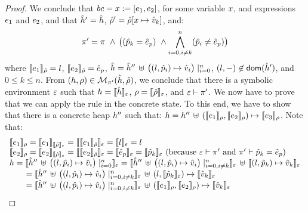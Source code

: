 \begin{proof}
\noindent{}
We conclude that $\bcmd = \jvar := [\jsilexpr_1, \jsilexpr_2]$, for some variable $\jvar$, and expressions $\jsilexpr_1$ and $\jsilexpr_2$, 
and that $\sheap' = \sheap$, $\sstore' = \sstore[\jvar \mapsto \sexprv_k]$, and: 
 $$\pc' =  \pc \ \wedge \, \big( (\sexprp_k = \sexpr_p) \ \wedge \bigwedge_{i = 0, i \neq k}^n (\sexprp_i \neq \sexpr_p) \big)$$
 where 
 $\symbeval{\jsilexpr_1}{\sstore} =  \loc$, $\symbeval{\jsilexpr_2}{\sstore} =  \sexpr_p$, 
 $\sheap = \sheap'' \, \uplus \, \big((l, \sexprp_i) \mapsto \sexprv_i\big)\mid_{i = 0}^n$, 
 $(l, -) \not\in \domain(\sheap')$, and $0 \leq k \leq n$. 
%
From $(\heap, \store) \in \smodels{\sheap, \sstore}{\pc'}$, we conclude that there is a symbolic environment
$\senv$ such that $\heap = \semexpr{\sheap}{\senv}$, $\store = \semexpr{\sstore}{\senv}$, and 
$\senv \vdash \pc'$. 
We now have to prove that we can apply the  rule in the concrete state.
To this end, we have to show that there is a concrete heap $\heap''$ such that:
$\heap = \heap'' \dunion \hcell{\symbeval{\jsilexpr_1}{\store}}{\symbeval{\jsilexpr_2}{\store}}{\symbeval{\jsilexpr_3}{\store}}$. 
Note that: 
$$
\begin{array}{l}
%
 \symbeval{\jsilexpr_1}{\store} = \symbeval{\jsilexpr_1}{\symbeval{\sstore}{\senv}} = \symbeval{\symbeval{\jsilexpr_1}{\sstore}}{\senv} 
    = \symbeval{\loc}{\senv} = \loc \\ 
  \symbeval{\jsilexpr_2}{\store}  = \symbeval{\jsilexpr_2}{\semexpr{\sstore}{\senv}} =  \symbeval{\symbeval{\jsilexpr_2}{\sstore}}{\senv}
   =  \symbeval{\sexpr_p}{\senv} = \symbeval{\sexprp_k}{\senv}  \text{ (because $\senv \vdash \pc'$ and $\pc' \vdash \sexprp_k = \sexpr_p$)} \\
 \heap = \semexpr{\sheap'' \, \uplus \, \big((l, \sexprp_i) \mapsto \sexprv_i\big)\mid_{i = 0}^n}{\senv} 
       =  \semexpr{\sheap'' \, \uplus \, \big((l, \sexprp_i) \mapsto \sexprv_i\big)\mid_{i = 0, i \neq k}^n}{\senv} \dunion \semexpr{(l, \sexprp_k) \mapsto \sexprv_k}{\senv} \\
         \qquad = \semexpr{\sheap'' \, \uplus \, \big((l, \sexprp_i) \mapsto \sexprv_i\big)\mid_{i = 0, i \neq k}^n}{\senv} \dunion (l, \semexpr{\sexprp_k}{\senv}) \mapsto \semexpr{\sexprv_k}{\senv}  \\ 
         \qquad =  \semexpr{\sheap'' \, \uplus \, \big((l, \sexprp_i) \mapsto \sexprv_i\big)\mid_{i = 0, i \neq k}^n}{\senv} \dunion (\symbeval{\jsilexpr_1}{\store}, \symbeval{\jsilexpr_2}{\store}) \mapsto \semexpr{\sexprv_k}{\senv}
\end{array}
$$
\end{proof}
